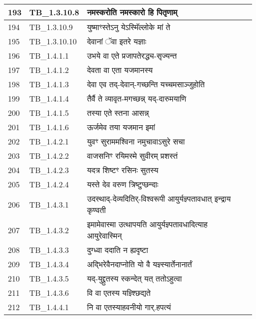 \documentclass[17pt]{extarticle}
\begin{document}
\begin{longtable}{||p{0.4in}||p{0.9in}||p{4.0in}||p{0.9in}||}
        \hline
            193 & TB\_1.3.10.8 & नमस्करोति नमस्कारो हि पितृणाम् &      \\
        \hline
            194 & TB\_1.3.10.9 & युष्माꣳस्तेऽनु येऽस्मिॅल्लोके मां ते &      \\
        \hline
            195 & TB\_1.3.10.10 & देवानां ॅवा इतरे यज्ञाः &      \\
        \hline
            196 & TB\_1.4.1.1 & उभये वा एते प्रजापतेरद्ध्य{-}सृज्यन्त &      \\
        \hline
            197 & TB\_1.4.1.2 & देवता वा एता यजमानस्य &      \\
        \hline
            198 & TB\_1.4.1.3 & देवा एव तद्{-}देवान्{-}गच्छन्ति यच्चमसाञ्जुहोति &      \\
        \hline
            199 & TB\_1.4.1.4 & तैर्वै ते व्यावृत{-}मगच्छन्न् यद्{-}दारुमयाणि &      \\
        \hline
            200 & TB\_1.4.1.5 & तस्या एते स्तना आसन्न् &      \\
        \hline
            201 & TB\_1.4.1.6 & ऊर्जमेव तया यजमान इमां &      \\
        \hline
            202 & TB\_1.4.2.1 & युवꣳ सुराममश्विना नमुचावाऽसुरे सचा &      \\
        \hline
            203 & TB\_1.4.2.2 & वाजसनिꣳ रयिमस्मे सुवीरम् प्रशस्तं &      \\
        \hline
            204 & TB\_1.4.2.3 & यदत्र शिष्टꣳ रसिनः सुतस्य &      \\
        \hline
            205 & TB\_1.4.2.4 & यस्ते देव वरुण त्रिष्टुप्छन्दाः &      \\
        \hline
            206 & TB\_1.4.3.1 & उदस्थाद्{-}देव्यदितिर्{-}विश्वरूपी आयुर्यज्ञ्पतावधात् इन्द्राय कृण्वती &      \\
        \hline
            207 & TB\_1.4.3.2 & इमामेवास्मा उत्थापयति आयुर्यज्ञ्पतावधादित्याह आयुरेवास्मिन् &      \\
        \hline
            208 & TB\_1.4.3.3 & दुग्ध्वा ददाति न ह्यदृष्टा &      \\
        \hline
            209 & TB\_1.4.3.4 & अद्भिरेवैनदाप्नोति यो वै यज्ञ्स्यार्तेनानार्तं &      \\
        \hline
            210 & TB\_1.4.3.5 & यद्{-}युद्द्रुतस्य स्कन्देत् यत् ततोऽहुत्वा &      \\
        \hline
            211 & TB\_1.4.3.6 & वि वा एतस्य यज्ञ्श्छिद्यते &      \\
        \hline
            212 & TB\_1.4.4.1 & नि वा एतस्याहवनीयो गार्.हपत्यं &      \\

\end{longtable}
\end{document}
